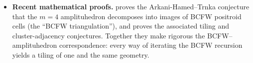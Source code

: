 \begin{itemize}
    \item \textbf{Recent mathematical proofs.} \autocite{Even-Zohar:2021sec} proves the Arkani-Hamed--Trnka conjecture that the $m=4$ amplituhedron decomposes into images of BCFW positroid cells (the ``BCFW triangulation''), and \autocite{Even-Zohar:2025ydi} proves the associated tiling and cluster-adjacency conjectures. Together they make rigorous the BCFW--amplituhedron correspondence: every way of iterating the BCFW recursion yields a tiling of one and the same geometry.

\end{itemize}